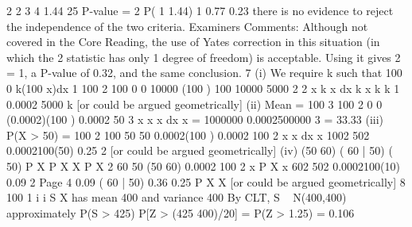 \documentclass[a4paper,12pt]{article}
\begin{document}
2
2 3
4 1.44
25
P-value = 2
P( 1 1.44) 1 0.77 0.23
there is no evidence to reject the independence of the two criteria.
Examiners Comments: Although not covered in the Core Reading, the use of Yates
correction in this situation (in which the 2 statistic has only 1 degree of freedom) is
acceptable. Using it gives 2 = 1, a P-value of 0.32, and the same conclusion.
7 (i) We require k such that
100
0
k(100 x)dx 1
100 2 100
0 0
10000
(100 ) 100 10000 5000
2 2
x
k x dx k x k k
1
0.0002
5000
k
[or could be argued geometrically]
(ii) Mean =
100 3 100
2
0 0
(0.0002)(100 ) 0.0002 50
3
x
x x dx x
=
1000000
0.0002{500000 }
3
= 33.33
(iii) P(X > 50) =
100 2 100
50 50
0.0002(100 ) 0.0002 100
2
x
x dx x
1002 502
0.0002{100(50) } 0.25
2
[or could be argued geometrically]
(iv)
(50 60)
( 60 | 50)
( 50)
P X
P X X
P X
2 60
50
(50 60) 0.0002 100
2
x
P X x
602 502
0.0002{100(10) } 0.09
2
Page 4
0.09
( 60 | 50) 0.36
0.25
P X X
[or could be argued geometrically]
8
100
1
i
i
S X has mean 400 and variance 400
By CLT, S ~ N(400,400) approximately
P(S > 425) P[Z > (425 400)/20] = P(Z > 1.25) = 0.106
\end{document}

